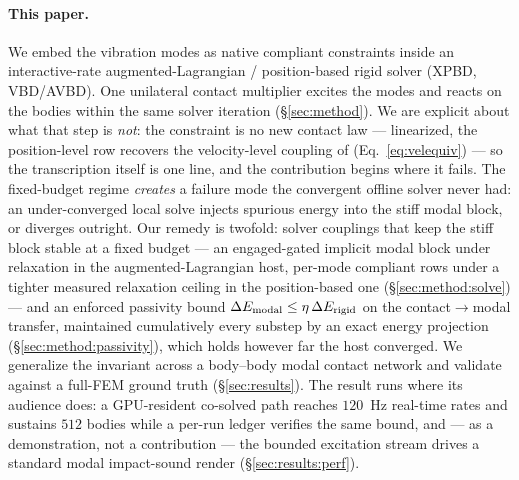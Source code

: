 \paragraph*{This paper.} We embed the vibration modes as native compliant constraints
inside an interactive-rate augmented-Lagrangian / position-based rigid solver
(XPBD, VBD/AVBD). One
unilateral contact multiplier excites the modes and reacts on the bodies within the
same solver iteration (\S\ref{sec:method}). We are explicit about what that step is
\emph{not}: the constraint is no new contact law --- linearized, the position-level
row recovers the velocity-level coupling of \citet{zheng2011}
(Eq.~\ref{eq:velequiv}) --- so the transcription itself is one line, and the
contribution begins where it fails. The fixed-budget regime \emph{creates} a failure
mode the convergent offline solver never had: an under-converged local solve injects
spurious energy into the stiff modal block, or diverges outright. Our remedy is
twofold: solver couplings that keep the stiff block stable at a fixed budget --- an
engaged-gated implicit modal block under relaxation in the augmented-Lagrangian host,
per-mode compliant rows under a tighter measured relaxation ceiling in the
position-based one (\S\ref{sec:method:solve}) --- and an enforced passivity bound
$\Delta E_{\mathrm{modal}} \le \eta\,\Delta E_{\mathrm{rigid}}$ on the contact$\to$modal transfer, maintained cumulatively
every substep by an exact energy projection (\S\ref{sec:method:passivity}), which
holds however far the host converged. We generalize the invariant across a
body--body modal contact network and validate against a full-FEM ground truth
(\S\ref{sec:results}). The result runs where its audience does: a GPU-resident
co-solved path reaches $120$~Hz real-time rates and sustains $512$ bodies
while a per-run ledger verifies the same bound, and --- as a demonstration,
not a contribution --- the bounded excitation stream drives a standard modal
impact-sound render (\S\ref{sec:results:perf}).

